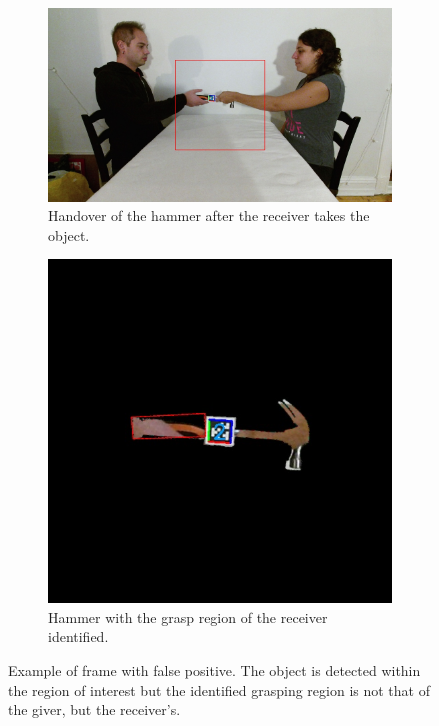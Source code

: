 \begin{figure}
	\centering
	\begin{subfigure}[b]{\textwidth}
		\centering
		\includegraphics[width=\textwidth]{img/methods/handovers/incorr_frame.jpg}
		\caption{Handover of the hammer after the receiver takes the object.}
		\label{fig:demo_handover_incorr}
	\end{subfigure}
	\par\bigskip
	\begin{subfigure}[b]{0.5\textwidth}
		\centering
		\includegraphics[width=\textwidth]{img/methods/handovers/incorr_mask.jpg}
		\caption{Hammer with the grasp region of the receiver identified.}
		\label{fig:handover_incorr_masked}
	\end{subfigure}
	\caption{Example of frame with false positive. The object is detected within the region of interest but the identified grasping region is not that of the giver, but the receiver's.}
	\label{fig:handover_incorr}
\end{figure}


